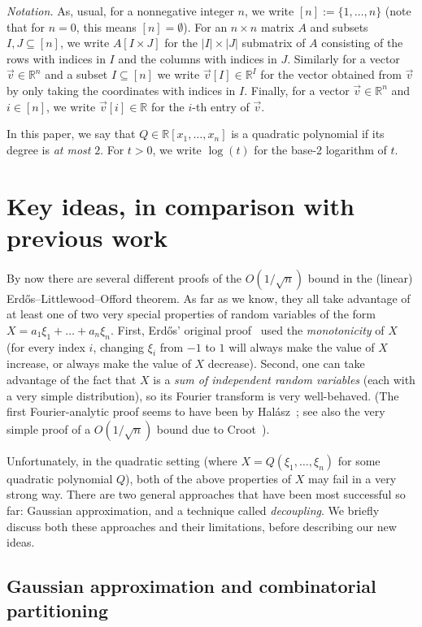 \documentclass[english]{article}
\theoremstyle{remark}
\numberwithin{equation}{section}
\numberwithin{figure}{section}
\newcommand{\su}{\subseteq}
\newcommand{\RR}{\mathbb{R}}
\begin{document}
\textit{Notation.} As, usual, for a nonnegative integer $n$, we write $[n]:=\{1,\dots,n\}$ (note that for $n=0$, this means $[n]=\emptyset$). For an $n\times n$ matrix $A$ and subsets $I,J\su [n]$, we write $A[I\times J]$ for the $|I|\times |J|$ submatrix of $A$ consisting of the rows with indices in $I$ and the columns with indices in $J$. Similarly for a vector $\vec v\in \RR^n$ and a subset $I\su [n]$ we write $\vec v[I]\in \RR^{I}$ for the vector obtained from $\vec v$ by only taking the coordinates with indices in $I$. Finally, for a vector $\vec v\in \RR^n$ and $i\in [n]$, we write $\vec v[i]\in \RR$ for the $i$-th entry of $\vec v$.

In this paper, we say that $Q\in \mathbb{R}[x_1,\dots,x_n]$ is a quadratic polynomial if its degree is \emph{at most} $2$. For $t>0$, we write $\log(t)$ for the base-2 logarithm of $t$.

\section{Key ideas, in comparison with previous work}\label{sec:outline}

By now there are several different proofs of the $O(1/\sqrt{n})$
bound in the (linear) Erd\H os--Littlewood--Offord theorem. As far as we
know, they all take advantage of at least one of two very special
properties of random variables of the form $X=a_{1}\xi_{1}+\dots+a_{n}\xi_{n}$.
First, Erd\H os' original proof~\cite{Erd45} used the \emph{monotonicity} of $X$
(for every index $i$, changing $\xi_{i}$ from $-1$ to $1$ will always make the value
of $X$ increase, or always make the value of $X$ decrease). Second,
one can take advantage of the fact that $X$ is a \emph{sum of independent
random variables} (each with a very simple distribution), so its Fourier transform is very well-behaved.
(The first Fourier-analytic proof seems to have been by Hal\'asz~\cite{Hal77};
see also the very simple proof of a $O(1/\sqrt n)$ bound due to Croot~\cite{Cro11}).

Unfortunately, in the quadratic setting (where $X=Q(\xi_{1},\dots,\xi_{n})$
for some quadratic polynomial $Q$), both of the above properties
of $X$ may fail in a very strong way. There
are two general approaches that have been most successful so far:
Gaussian approximation, and a technique called \emph{decoupling}.
We briefly discuss both these approaches and their limitations, before
describing our new ideas.

\subsection{Gaussian approximation and combinatorial partitioning}
\end{document}
